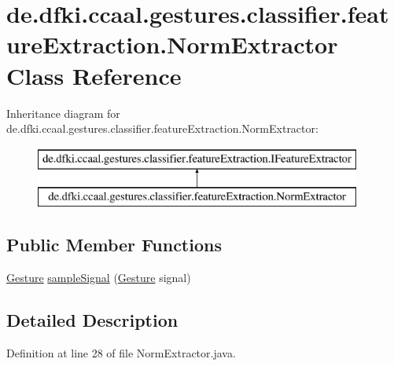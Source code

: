 \hypertarget{classde_1_1dfki_1_1ccaal_1_1gestures_1_1classifier_1_1feature_extraction_1_1_norm_extractor}{\section{de.\-dfki.\-ccaal.\-gestures.\-classifier.\-feature\-Extraction.\-Norm\-Extractor Class Reference}
\label{classde_1_1dfki_1_1ccaal_1_1gestures_1_1classifier_1_1feature_extraction_1_1_norm_extractor}
}
Inheritance diagram for de.\-dfki.\-ccaal.\-gestures.\-classifier.\-feature\-Extraction.\-Norm\-Extractor\-:\begin{figure}[H]
\begin{center}
\leavevmode
\includegraphics[height=2.000000cm]{classde_1_1dfki_1_1ccaal_1_1gestures_1_1classifier_1_1feature_extraction_1_1_norm_extractor}
\end{center}
\end{figure}
\subsection*{Public Member Functions}
\begin{DoxyCompactItemize}
\item 
\hyperlink{classde_1_1dfki_1_1ccaal_1_1gestures_1_1_gesture}{Gesture} \hyperlink{classde_1_1dfki_1_1ccaal_1_1gestures_1_1classifier_1_1feature_extraction_1_1_norm_extractor_a9a0018b2d5b550ea914b3d2e5bbc7273}{sample\-Signal} (\hyperlink{classde_1_1dfki_1_1ccaal_1_1gestures_1_1_gesture}{Gesture} signal)
\end{DoxyCompactItemize}


\subsection{Detailed Description}


Definition at line 28 of file Norm\-Extractor.\-java.



